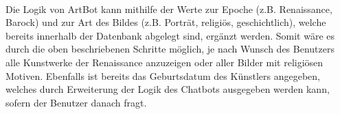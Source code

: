 \\
Die Logik von ArtBot kann mithilfe der Werte zur Epoche (z.B. Renaissance, Barock) und zur Art des Bildes (z.B. Porträt, religiös, geschichtlich), welche bereits innerhalb der Datenbank abgelegt sind, ergänzt werden. Somit wäre es durch die oben beschriebenen Schritte möglich, je nach Wunsch des Benutzers alle Kunstwerke der Renaissance anzuzeigen oder aller Bilder mit religiösen Motiven. Ebenfalls ist bereits das Geburtsdatum des Künstlers angegeben, welches durch Erweiterung der Logik des Chatbots ausgegeben werden kann, sofern der Benutzer danach fragt.
